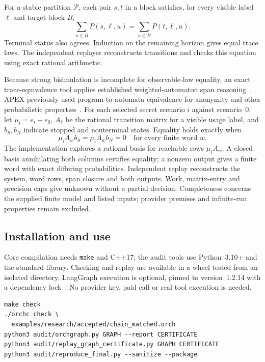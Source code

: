 \documentclass[preprint,12pt, a4paper]{elsarticle}
\begin{document}
For a stable partition $\mathcal{P}$, each pair $s,t$ in a block satisfies, for every visible label $\ell$ and target block $B$,
\begin{equation}
\sum_{u\in B}P(s,\ell,u)=\sum_{u\in B}P(t,\ell,u).
\end{equation}
Terminal status also agrees. Induction on the remaining horizon gives equal trace laws. The independent replayer reconstructs transitions and checks this equation using exact rational arithmetic.

Because strong bisimulation is incomplete for observable-law equality, an exact trace-equivalence tool applies established weighted-automaton span reasoning~\cite{tzeng,langeq,qweighted}. APEX previously used program-to-automata equivalence for anonymity and other probabilistic properties~\cite{apex}. For each selected secret scenario $i$ against scenario~0, let $\mu_i=e_i-e_0$, $A_\ell$ be the rational transition matrix for a visible usage label, and $b_S,b_N$ indicate stopped and nonterminal states. Equality holds exactly when
\begin{equation}
\mu_i A_w b_S=\mu_i A_w b_N=0\quad\mbox{for every finite word }w.
\end{equation}
The implementation explores a rational basis for reachable rows $\mu_i A_w$. A closed basis annihilating both columns certifies equality; a nonzero output gives a finite word with exact differing probabilities. Independent replay reconstructs the system, word rows, span closure and both outputs. Work, matrix-entry and precision caps give unknown without a partial decision. Completeness concerns the supplied finite model and listed inputs; provider premises and infinite-run properties remain excluded.

\subsection{Installation and use}
Core compilation needs \texttt{make} and C++17; the audit tools use Python~3.10+ and the standard library. Checking and replay are available in a wheel tested from an isolated directory. LangGraph execution is optional, pinned to version~1.2.14 with a dependency lock~\cite{langgraph}. No provider key, paid call or real tool execution is needed.

\begin{verbatim}
make check
./orchc check \
  examples/research/accepted/chain_matched.orch
python3 audit/orchgraph.py GRAPH --report CERTIFICATE
python3 audit/replay_graph_certificate.py GRAPH CERTIFICATE
python3 audit/reproduce_final.py --sanitize --package
\end{verbatim}
\end{document}
